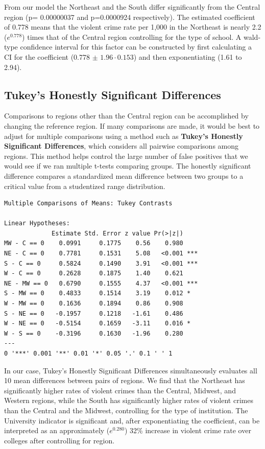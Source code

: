 \documentclass[
]{krantz}
\begin{document}
From our model the Northeast and the South differ significantly from the Central region (p= 0.00000037 and p=0.0000924 respectively). The estimated coefficient of 0.778 means that the violent crime rate per 1,000 in the Northeast is nearly 2.2 (\(e^{0.778}\)) times that of the Central region controlling for the type of school. A wald-type confidence interval for this factor can be constructed by first calculating a CI for the coefficient (0.778 \(\pm\) \(1.96 \cdot 0.153\)) and then exponentiating (1.61 to 2.94).

\hypertarget{tukeys-honestly-significant-differences}{%
\subsection{Tukey's Honestly Significant Differences}\label{tukeys-honestly-significant-differences}}

Comparisons to regions other than the Central region can be accomplished by changing the reference region. If many comparisons are made, it would be best to adjust for multiple comparisons using a method such as \textbf{Tukey's Honestly Significant Differences}, which considers all pairwise comparisons among regions. This method helps control the large number of false positives that we would see if we ran multiple t-tests comparing groups. The honestly significant difference compares a standardized mean difference between two groups to a critical value from a studentized range distribution.

\begin{verbatim}
Multiple Comparisons of Means: Tukey Contrasts

Linear Hypotheses:
             Estimate Std. Error z value Pr(>|z|)    
MW - C == 0    0.0991     0.1775    0.56    0.980    
NE - C == 0    0.7781     0.1531    5.08   <0.001 ***
S - C == 0     0.5824     0.1490    3.91   <0.001 ***
W - C == 0     0.2628     0.1875    1.40    0.621    
NE - MW == 0   0.6790     0.1555    4.37   <0.001 ***
S - MW == 0    0.4833     0.1514    3.19    0.012 *  
W - MW == 0    0.1636     0.1894    0.86    0.908    
S - NE == 0   -0.1957     0.1218   -1.61    0.486    
W - NE == 0   -0.5154     0.1659   -3.11    0.016 *  
W - S == 0    -0.3196     0.1630   -1.96    0.280    
---
0 '***' 0.001 '**' 0.01 '*' 0.05 '.' 0.1 ' ' 1
\end{verbatim}

In our case, Tukey's Honestly Significant Differences simultaneously evaluates all 10 mean differences between pairs of regions. We find that the Northeast has significantly higher rates of violent crimes than the Central, Midwest, and Western regions, while the South has significantly higher rates of violent crimes than the Central and the Midwest, controlling for the type of institution. The University indicator is significant and, after exponentiating the coefficient, can be interpreted as an approximately (\(e^{0.280}\)) 32\% increase in violent crime rate over colleges after controlling for region.
\end{document}
